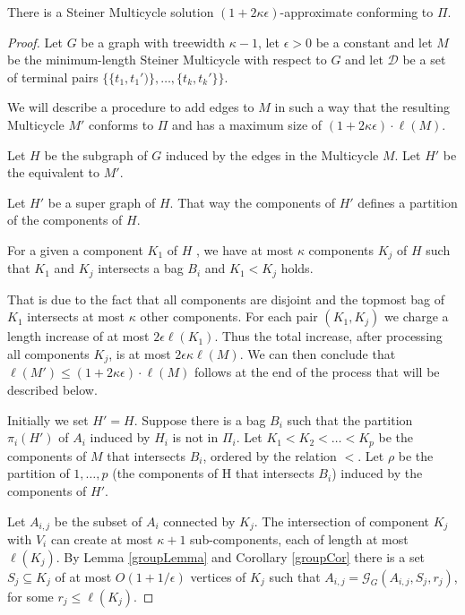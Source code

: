 \begin{theorem}\label{conformingPi}

There is a Steiner Multicycle solution \((1 + 2 \kappa \epsilon)\)-approximate conforming to \(\Pi\).

\end{theorem}
\begin{proof}

Let \(G\) be a graph with treewidth \(\kappa - 1\), let \(\epsilon > 0\) be a constant and let \(M\) be the minimum-length Steiner Multicycle with respect to \(G\) and let \(\mathcal{D}\) be a set of terminal pairs \(\{\{t_1, t_1')\}, \dots, \{t_k, t_k'\}\}\).

We will describe a procedure to add edges to \(M\) in such a way that the resulting Multicycle \(M'\) conforms to \(\Pi\) and has a maximum size of \((1 + 2\kappa \epsilon ) \cdot \ell(M)\).

Let \(H\) be the subgraph of \(G\) induced by the edges in the Multicycle \(M\). Let \(H'\) be the equivalent to \(M'\). 

Let \(H'\) be a super graph of \(H\). That way the components of \(H'\) defines a partition of the components of \(H\).

For a given a component \(K_1\) of \(H\) , we have at most \(\kappa\) components \(K_j\) of \(H\) such that \(K_1\) and \(K_j\) intersects a bag \(B_i\) and \(K_1 < K_j\) holds.

That is due to the fact that all components are disjoint and the topmost bag of \(K_1\) intersects at most \(\kappa\) other components. For each pair \((K_1, K_j)\) we charge a length increase of at most \(2 \epsilon \ell(K_1)\). Thus the total increase, after processing all components \(K_j\), is at most \(2 \epsilon \kappa \ell(M)\). We can then conclude that \(\ell(M') \leq (1 + 2 \kappa \epsilon) \cdot \ell(M)\) follows at the end of the process that will be described below.

Initially we set \(H' = H\). Suppose there is a bag \(B_i\) such that the partition \(\pi_i(H')\) of \(A_i\) induced by \(H_i\) is not in \(\Pi_i\). Let \(K_1 < K_2 < \dots < K_p\) be the components of \(M\) that intersects \(B_i\), ordered by the relation \(<\). Let \(\rho\) be the partition of \({1, \dots, p}\) (the components of H that intersects \(B_i\)) induced by the components of \(H'\).

Let \(A_{i, j}\) be the subset of \(A_i\) connected by \(K_j\). The intersection of component \(K_j\) with \(V_i\) can create at most \(\kappa + 1\) sub-components, each of length at most \(\ell(K_j)\). By Lemma \ref{groupLemma} and Corollary \ref{groupCor} there is a set \(S_j \subseteq K_j\) of at most \(O(1 + 1/\epsilon)\) vertices of \(K_j\) such that \(A_{i,j} = \mathcal{G}_G(A_{i,j}, S_j, r_j)\), for some \(r_j \leq \ell(K_j)\).


\end{proof}
